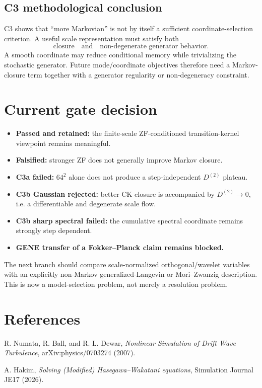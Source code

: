 \documentclass[11pt,a4paper]{article}
\begin{document}
\subsection{C3 methodological conclusion}
C3 shows that ``more Markovian'' is not by itself a sufficient coordinate-selection criterion. A useful scale representation must satisfy both
\[
\text{closure}
\quad\text{and}\quad
\text{non-degenerate generator behavior}.
\]
A smooth coordinate may reduce conditional memory while trivializing the stochastic generator. Future mode/coordinate objectives therefore need a Markov-closure term together with a generator regularity or non-degeneracy constraint.

\section{Current gate decision}
\begin{itemize}
\item \textbf{Passed and retained:} the finite-scale ZF-conditioned transition-kernel viewpoint remains meaningful.
\item \textbf{Falsified:} stronger ZF does not generally improve Markov closure.
\item \textbf{C3a failed:} $64^2$ alone does not produce a step-independent $D^{(2)}$ plateau.
\item \textbf{C3b Gaussian rejected:} better CK closure is accompanied by $D^{(2)}\to0$, i.e. a differentiable and degenerate scale flow.
\item \textbf{C3b sharp spectral failed:} the cumulative spectral coordinate remains strongly step dependent.
\item \textbf{GENE transfer of a Fokker--Planck claim remains blocked.}
\end{itemize}
The next branch should compare scale-normalized orthogonal/wavelet variables with an explicitly non-Markov generalized-Langevin or Mori--Zwanzig description. This is now a model-selection problem, not merely a resolution problem.

\section{References}
R. Numata, R. Ball, and R. L. Dewar, \emph{Nonlinear Simulation of Drift Wave Turbulence}, arXiv:physics/0703274 (2007).

A. Hakim, \emph{Solving (Modified) Hasegawa--Wakatani equations}, Simulation Journal JE17 (2026).
\end{document}
